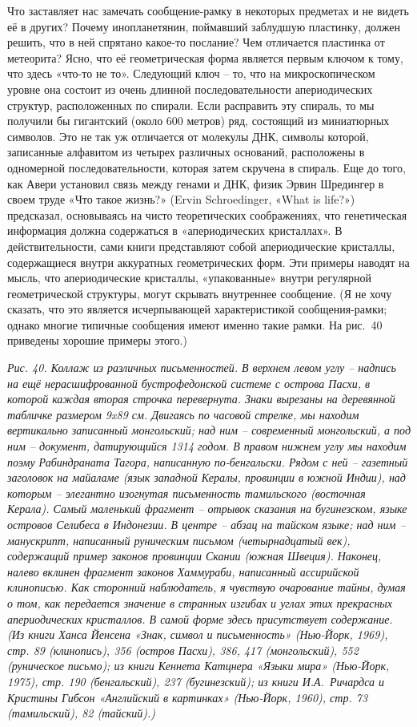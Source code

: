 \documentclass[../main.tex]{subfiles}
\begin{document}
Что заставляет нас замечать сообщение-рамку в некоторых предметах и не видеть её в других? Почему инопланетянин, поймавший заблудшую пластинку, должен решить, что в ней спрятано какое-то послание? Чем отличается пластинка от метеорита? Ясно, что её геометрическая форма является первым ключом к тому, что здесь «что-то не то». Следующий ключ \--- то, что на микроскопическом уровне она состоит из очень длинной последовательности апериодических структур, расположенных по спирали. Если расправить эту спираль, то мы получили бы гигантский (около 600 метров) ряд, состоящий из миниатюрных символов. Это не так уж отличается от молекулы ДНК, символы которой, записанные алфавитом из четырех различных оснований, расположены в одномерной последовательности, которая затем скручена в спираль. Еще до того, как Авери установил связь между генами и ДНК, физик Эрвин Шредингер в своем труде «Что такое жизнь?» (Ervin Schroedinger, «What is life?») предсказал, основываясь на чисто теоретических соображениях, что генетическая информация должна содержаться в «апериодических кристаллах». В действительности, сами книги представляют собой апериодические кристаллы, содержащиеся внутри аккуратных геометрических форм. Эти примеры наводят на мысль, что апериодические кристаллы, «упакованные» внутри регулярной геометрической структуры, могут скрывать внутреннее сообщение. (Я не хочу сказать, что это является исчерпывающей характеристикой сообщения-рамки; однако многие типичные сообщения имеют именно такие рамки. На рис.~40 приведены хорошие примеры этого.)

\emph{Рис. 40. Коллаж из различных письменностей. В верхнем левом углу \--- надпись на ещё нерасшифрованной бустрофедонской системе с острова Пасхи, в которой каждая вторая строчка перевернута. Знаки вырезаны на деревянной табличке размером 9x89 см. Двигаясь по часовой стрелке, мы находим вертикально записанный монгольский; над ним \--- современный монгольский, а под ним \--- документ, датирующийся 1314 годом. В правом нижнем углу мы находим поэму Рабиндраната Тагора, написанную по-бенгальски. Рядом с ней \--- газетный заголовок на майаламе (язык западной Кералы, провинции в южной Индии), над которым \--- элегантно изогнутая письменность тамильского (восточная Керала). Самый маленький фрагмент \--- отрывок сказания на бугинезском, языке островов Селибеса в Индонезии. В центре \--- абзац на тайском языке; над ним \--- манускрипт, написанный руническим письмом (четырнадцатый век), содержащий пример законов провинции Скании (южная Швеция). Наконец, налево вклинен фрагмент законов Хаммураби, написанный ассирийской клинописью. Как сторонний наблюдатель, я чувствую очарование тайны, думая о том, как передается значение в странных изгибах и углах этих прекрасных апериодических кристаллов. В самой форме здесь присутствует содержание. (Из книги Ханса Йенсена «Знак, символ и письменность» (Нью-Йорк, 1969), стр. 89 (клинопись), 356 (остров Пасхи), 386, 417 (монгольский), 552 (руническое письмо); из книги Кеннета Катцнера «Языки мира» (Нью-Йорк, 1975), стр. 190 (бенгальский), 237 (бугинезский); из книги И.А.~Ричардса и Кристины Гибсон «Английский в картинках» (Нью-Йорк, 1960), стр. 73 (тамильский), 82 (тайский).)}
\end{document}
